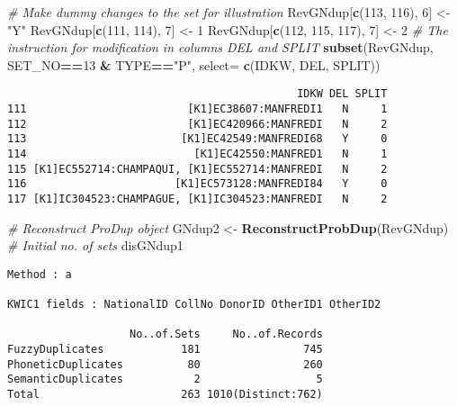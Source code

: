 \documentclass[
]{article}
\newenvironment{Shaded}{\begin{snugshade}}{\end{snugshade}}
\newcommand{\CommentTok}[1]{\textcolor[rgb]{0.56,0.35,0.01}{\textit{#1}}}
\newcommand{\DataTypeTok}[1]{\textcolor[rgb]{0.13,0.29,0.53}{#1}}
\newcommand{\DecValTok}[1]{\textcolor[rgb]{0.00,0.00,0.81}{#1}}
\newcommand{\KeywordTok}[1]{\textcolor[rgb]{0.13,0.29,0.53}{\textbf{#1}}}
\newcommand{\NormalTok}[1]{#1}
\newcommand{\OperatorTok}[1]{\textcolor[rgb]{0.81,0.36,0.00}{\textbf{#1}}}
\newcommand{\StringTok}[1]{\textcolor[rgb]{0.31,0.60,0.02}{#1}}
\begin{document}
\begin{Shaded}
\begin{Highlighting}[]
\CommentTok{# Make dummy changes to the set for illustration}
\NormalTok{RevGNdup[}\KeywordTok{c}\NormalTok{(}\DecValTok{113}\NormalTok{, }\DecValTok{116}\NormalTok{), }\DecValTok{6}\NormalTok{] <-}\StringTok{ "Y"}
\NormalTok{RevGNdup[}\KeywordTok{c}\NormalTok{(}\DecValTok{111}\NormalTok{, }\DecValTok{114}\NormalTok{), }\DecValTok{7}\NormalTok{] <-}\StringTok{ }\DecValTok{1}
\NormalTok{RevGNdup[}\KeywordTok{c}\NormalTok{(}\DecValTok{112}\NormalTok{, }\DecValTok{115}\NormalTok{, }\DecValTok{117}\NormalTok{), }\DecValTok{7}\NormalTok{] <-}\StringTok{ }\DecValTok{2}
\CommentTok{# The instruction for modification in columns DEL and SPLIT}
\KeywordTok{subset}\NormalTok{(RevGNdup, SET_NO}\OperatorTok{==}\DecValTok{13} \OperatorTok{&}\StringTok{ }\NormalTok{TYPE}\OperatorTok{==}\StringTok{"P"}\NormalTok{, }\DataTypeTok{select=} \KeywordTok{c}\NormalTok{(IDKW, DEL, SPLIT))}
\end{Highlighting}
\end{Shaded}

\begin{verbatim}
                                             IDKW DEL SPLIT
111                         [K1]EC38607:MANFREDI1   N     1
112                         [K1]EC420966:MANFREDI   N     2
113                        [K1]EC42549:MANFREDI68   Y     0
114                          [K1]EC42550:MANFRED1   N     1
115 [K1]EC552714:CHAMPAQUI, [K1]EC552714:MANFREDI   N     2
116                       [K1]EC573128:MANFREDI84   Y     0
117 [K1]IC304523:CHAMPAGUE, [K1]IC304523:MANFREDI   N     2
\end{verbatim}

\begin{Shaded}
\begin{Highlighting}[]
\CommentTok{# Reconstruct ProDup object}
\NormalTok{GNdup2 <-}\StringTok{ }\KeywordTok{ReconstructProbDup}\NormalTok{(RevGNdup)}
\CommentTok{# Initial no. of sets}
\NormalTok{disGNdup1}
\end{Highlighting}
\end{Shaded}

\begin{verbatim}
Method : a

KWIC1 fields : NationalID CollNo DonorID OtherID1 OtherID2
 
                   No..of.Sets     No..of.Records
FuzzyDuplicates            181                745
PhoneticDuplicates          80                260
SemanticDuplicates           2                  5
Total                      263 1010(Distinct:762)
\end{verbatim}
\end{document}
